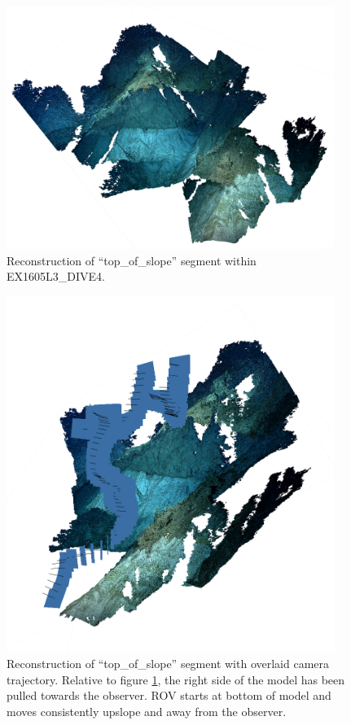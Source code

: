 \documentclass[letterpaper,12pt]{article}
\begin{document}
\begin{figure}
    \centering
    \includegraphics[width=0.95\textwidth]{images/top_of_slope_reconstruction.png}
    \caption{Reconstruction of ``top\_of\_slope'' segment within EX1605L3\_DIVE4.}
    \label{fig:top_of_slope_photoscan}
\end{figure}

\begin{figure}
    \centering
    \includegraphics[width=0.95\textwidth]{images/top_of_slope_reconstruction_trajectory.png}
    \caption{Reconstruction of ``top\_of\_slope'' segment with overlaid camera trajectory.  Relative to figure \ref{fig:top_of_slope_photoscan}, the right side of the model has been pulled towards the observer.  ROV starts at bottom of model and moves consistently upslope and away from the observer.}
    \label{fig:top_of_slope_photoscan_trajectory}
\end{figure}
\end{document}
